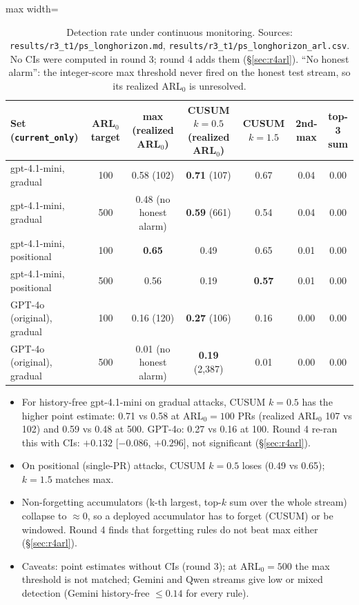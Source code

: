 \documentclass[11pt]{article}
\newcommand{\m}{\ensuremath{-}}
\begin{document}
\begin{table}[!htbp]\centering\small
\begin{adjustbox}{max width=\linewidth}\begin{tabular}{@{}lcccccc@{}}
\toprule
Set (\texttt{current\_only}) & ARL$_0$ target & max (realized ARL$_0$) & CUSUM $k{=}0.5$ (realized ARL$_0$) & CUSUM $k{=}1.5$ & 2nd-max & top-3 sum\\
\midrule
gpt-4.1-mini, gradual & 100 & 0.58 (102) & \textbf{0.71} (107) & 0.67 & 0.04 & 0.00\\
gpt-4.1-mini, gradual & 500 & 0.48 (no honest alarm) & \textbf{0.59} (661) & 0.54 & 0.04 & 0.00\\
gpt-4.1-mini, positional & 100 & \textbf{0.65} & 0.49 & 0.65 & 0.01 & 0.00\\
gpt-4.1-mini, positional & 500 & 0.56 & 0.19 & \textbf{0.57} & 0.01 & 0.00\\
GPT-4o (original), gradual & 100 & 0.16 (120) & \textbf{0.27} (106) & 0.16 & 0.00 & 0.00\\
GPT-4o (original), gradual & 500 & 0.01 (no honest alarm) & \textbf{0.19} (2{,}387) & 0.01 & 0.00 & 0.00\\
\bottomrule
\end{tabular}\end{adjustbox}
\caption{Detection rate under continuous monitoring. Sources: \nolinkurl{results/r3_t1/ps_longhorizon.md}, \nolinkurl{results/r3_t1/ps_longhorizon_arl.csv}. No CIs were computed in round 3; round 4 adds them (\S\ref{sec:r4arl}). ``No honest alarm'': the integer-score max threshold never fired on the honest test stream, so its realized ARL$_0$ is unresolved.}\label{tab:longh}
\end{table}

\begin{itemize}
\item For history-free gpt-4.1-mini on gradual attacks, CUSUM $k{=}0.5$ has the higher point estimate: 0.71 vs 0.58 at ARL$_0=100$ PRs (realized ARL$_0$ 107 vs 102) and 0.59 vs 0.48 at 500. GPT-4o: 0.27 vs 0.16 at 100. Round 4 re-ran this with CIs: $+0.132$ [$\m0.086$, $+0.296]$, not significant (\S\ref{sec:r4arl}).
\item On positional (single-PR) attacks, CUSUM $k{=}0.5$ loses (0.49 vs 0.65); $k{=}1.5$ matches max.
\item Non-forgetting accumulators (k-th largest, top-$k$ sum over the whole stream) collapse to $\approx0$, so a deployed accumulator has to forget (CUSUM) or be windowed. Round 4 finds that forgetting rules do not beat max either (\S\ref{sec:r4arl}).
\item Caveats: point estimates without CIs (round 3); at ARL$_0=500$ the max threshold is not matched; Gemini and Qwen streams give low or mixed detection (Gemini history-free $\le0.14$ for every rule).
\end{itemize}
\end{document}
